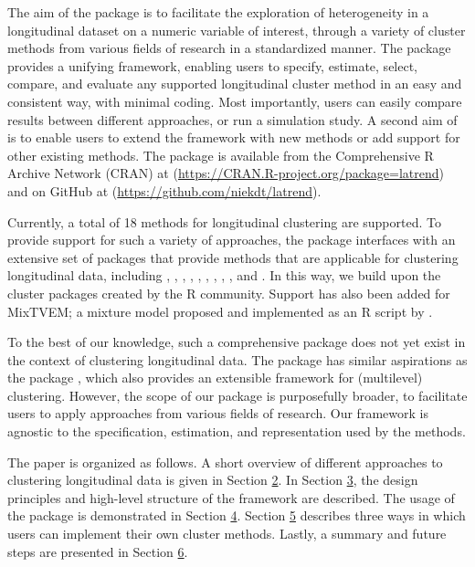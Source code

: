 The aim of the  package is to facilitate the exploration of heterogeneity in a longitudinal dataset on a numeric variable of interest, through a variety of cluster methods from various fields of research in a standardized manner. The package provides a unifying framework, enabling users to specify, estimate, select, compare, and evaluate any supported longitudinal cluster method in an easy and consistent way, with minimal coding. Most importantly, users can easily compare results between different approaches, or run a simulation study. A second aim of  is to enable users to extend the framework with new methods or add support for other existing methods. The  package is available from the Comprehensive R Archive Network (CRAN) at (\url{https://CRAN.R-project.org/package=latrend}) and on GitHub at (\url{https://github.com/niekdt/latrend}).

Currently, a total of 18 methods for longitudinal clustering are supported. To provide support for such a variety of approaches, the  package interfaces with an extensive set of packages that provide methods that are applicable for clustering longitudinal data, including  \citep{Adepeju2020akmedoids},  \citep{Nielsen2018crimCV},  \citep{sardaespinosa2019time},  \citep{gruen2008flexMix},  \citep{Bouveyron2015funFEM},  \citep{genolini2015kml},  \citep{proustlima2017estimation},  \citep{Scrucca2016mclust},  \citep{Komarek2009New}, and  \citep{benaglia2009mixtools}. In this way, we build upon the cluster packages created by the R community. Support has also been added for MixTVEM; a mixture model proposed and implemented as an R script by \citet{dziak2015modeling}.

To the best of our knowledge, such a comprehensive package does not yet exist in the context of clustering longitudinal data. The  package has similar aspirations as the  package \citep{gruen2008flexMix}, which also provides an extensible framework for (multilevel) clustering. However, the scope of our package is purposefully broader, to facilitate users to apply approaches from various fields of research. Our framework is agnostic to the specification, estimation, and representation used by the methods.

The paper is organized as follows. A short overview of different approaches to clustering longitudinal data is given in Section \hyperref[sec:methods]{2}. In Section \hyperref[sec:design]{3}, the design principles and high-level structure of the framework are described. The usage of the package is demonstrated in Section \hyperref[sec:demo]{4}. Section \hyperref[sec:extension]{5} describes three ways in which users can implement their own cluster methods. Lastly, a summary and future steps are presented in Section \hyperref[sec:discussion]{6}.

